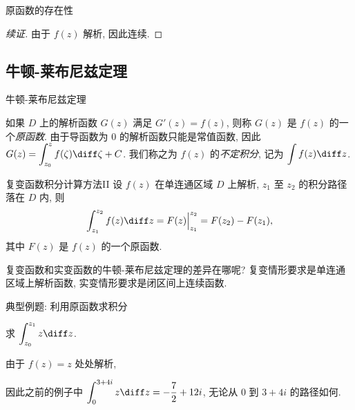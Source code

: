 \begin{frame}{原函数的存在性}
	\onslide<+->
	\begin{proof}[续证]
		由于 $f(z)$ 解析, 因此连续.
		\onslide<+->{由于 $\varepsilon$ 是任意的, 因此
		\[f(z)=\lim_{\Delta z\to 0}\frac{F(z+\Delta z)-F(z)}{\Delta z}=F'(z).\qedhere\]}
	\end{proof}
\end{frame}


\subsection{牛顿-莱布尼兹定理}

\begin{frame}{牛顿-莱布尼兹定理}

	\onslide<+->
	如果 $D$ 上的解析函数 $G(z)$ 满足 $G'(z)=f(z)$, 则称 $G(z)$ 是 $f(z)$ 的一个\emph{原函数}.
	\onslide<+->
	由于导函数为 $0$ 的解析函数只能是常值函数,
	\onslide<+->
	因此 $\displaystyle G(z)=\int_{z_0}^zf(\zeta)\diff \zeta+C$.
	\onslide<+->
	我们称之为 $f(z)$ 的\emph{不定积分}, 记为 \emph{$\displaystyle\int f(z)\diff z$}.

	\onslide<+->
	\begin{second}{复变函数积分计算方法II}
		设 $f(z)$ 在单连通区域 $D$ 上解析, $z_1$ 至 $z_2$ 的积分路径落在 $D$ 内, 则
		\[
			\int_{z_1}^{z_2}f(z)\diff z=F(z)\Big|_{z_1}^{z_2}=F(z_2)-F(z_1),\]
		其中 $F(z)$ 是 $f(z)$ 的一个原函数.
	\end{second}

	\onslide<+->
	复变函数和实变函数的牛顿-莱布尼兹定理的差异在哪呢?
	\onslide<+->
	复变情形要求是\alert{单连通区域上解析函数}, 实变情形要求是\alert{闭区间上连续函数}.
\end{frame}


\begin{frame}{典型例题: 利用原函数求积分}
	\onslide<+->
	\begin{example}
		求 $\displaystyle\int_{z_0}^{z_1}z\diff z$.
	\end{example}

	\onslide<+->
	\begin{solution}
		由于 $f(z)=z$ 处处解析,
		\vspace{-.5\baselineskip}
	\end{solution}
	\onslide<+->
	因此之前的例子中 $\displaystyle\int_0^{3+4i}z\diff z=-\frac72+12i$, 无论从 $0$ 到 $3+4i$ 的路径如何.
\end{frame}


